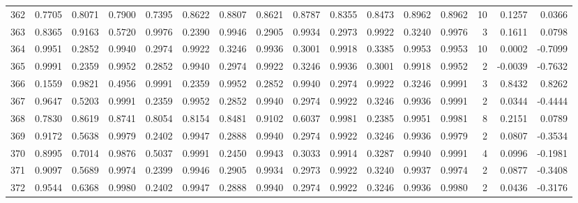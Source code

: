 \begin{tabular}{lrrrrrrrrrrrrrrr}
362 &      0.7705 &  0.8071 &  0.7900 &  0.7395 &  0.8622 &  0.8807 &  0.8621 &  0.8787 &  0.8355 &  0.8473 &   0.8962 &     0.8962 &     10 &                    0.1257 &                     0.0366 \\
363 &      0.8365 &  0.9163 &  0.5720 &  0.9976 &  0.2390 &  0.9946 &  0.2905 &  0.9934 &  0.2973 &  0.9922 &   0.3240 &     0.9976 &      3 &                    0.1611 &                     0.0798 \\
364 &      0.9951 &  0.2852 &  0.9940 &  0.2974 &  0.9922 &  0.3246 &  0.9936 &  0.3001 &  0.9918 &  0.3385 &   0.9953 &     0.9953 &     10 &                    0.0002 &                    -0.7099 \\
365 &      0.9991 &  0.2359 &  0.9952 &  0.2852 &  0.9940 &  0.2974 &  0.9922 &  0.3246 &  0.9936 &  0.3001 &   0.9918 &     0.9952 &      2 &                   -0.0039 &                    -0.7632 \\
366 &      0.1559 &  0.9821 &  0.4956 &  0.9991 &  0.2359 &  0.9952 &  0.2852 &  0.9940 &  0.2974 &  0.9922 &   0.3246 &     0.9991 &      3 &                    0.8432 &                     0.8262 \\
367 &      0.9647 &  0.5203 &  0.9991 &  0.2359 &  0.9952 &  0.2852 &  0.9940 &  0.2974 &  0.9922 &  0.3246 &   0.9936 &     0.9991 &      2 &                    0.0344 &                    -0.4444 \\
368 &      0.7830 &  0.8619 &  0.8741 &  0.8054 &  0.8154 &  0.8481 &  0.9102 &  0.6037 &  0.9981 &  0.2385 &   0.9951 &     0.9981 &      8 &                    0.2151 &                     0.0789 \\
369 &      0.9172 &  0.5638 &  0.9979 &  0.2402 &  0.9947 &  0.2888 &  0.9940 &  0.2974 &  0.9922 &  0.3246 &   0.9936 &     0.9979 &      2 &                    0.0807 &                    -0.3534 \\
370 &      0.8995 &  0.7014 &  0.9876 &  0.5037 &  0.9991 &  0.2450 &  0.9943 &  0.3033 &  0.9914 &  0.3287 &   0.9940 &     0.9991 &      4 &                    0.0996 &                    -0.1981 \\
371 &      0.9097 &  0.5689 &  0.9974 &  0.2399 &  0.9946 &  0.2905 &  0.9934 &  0.2973 &  0.9922 &  0.3240 &   0.9937 &     0.9974 &      2 &                    0.0877 &                    -0.3408 \\
372 &      0.9544 &  0.6368 &  0.9980 &  0.2402 &  0.9947 &  0.2888 &  0.9940 &  0.2974 &  0.9922 &  0.3246 &   0.9936 &     0.9980 &      2 &                    0.0436 &                    -0.3176 \\

\end{tabular}
